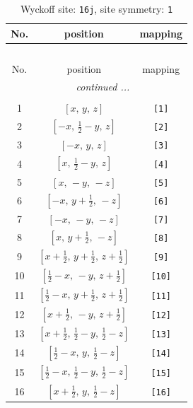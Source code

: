 \documentclass[fleqn,8pt]{jsarticle}
\begin{document}
\begin{longtable}{ccc}
\caption{Wyckoff site: {\tt 16j}, site symmetry: {\tt 1}}
 \\
 \hline \hline
No. & position & mapping \\ \hline \endfirsthead

\multicolumn{2}{l}{\tablename\ \thetable{}} \\
 \hline \hline
No. & position & mapping \\ \hline \endhead

 \hline \hline
\multicolumn{2}{r}{\footnotesize\it continued ...} \\ \endfoot

 \hline \hline
\multicolumn{2}{r}{} \\ \endlastfoot

1 & $\left[ x,\, y,\, z \right]$ & {\tt [1]} \\ \hline
2 & $\left[ - x,\, \frac{1}{2} - y,\, z \right]$ & {\tt [2]} \\ \hline
3 & $\left[ - x,\, y,\, z \right]$ & {\tt [3]} \\ \hline
4 & $\left[ x,\, \frac{1}{2} - y,\, z \right]$ & {\tt [4]} \\ \hline
5 & $\left[ x,\, - y,\, - z \right]$ & {\tt [5]} \\ \hline
6 & $\left[ - x,\, y + \frac{1}{2},\, - z \right]$ & {\tt [6]} \\ \hline
7 & $\left[ - x,\, - y,\, - z \right]$ & {\tt [7]} \\ \hline
8 & $\left[ x,\, y + \frac{1}{2},\, - z \right]$ & {\tt [8]} \\ \hline
9 & $\left[ x + \frac{1}{2},\, y + \frac{1}{2},\, z + \frac{1}{2} \right]$ & {\tt [9]} \\ \hline
10 & $\left[ \frac{1}{2} - x,\, - y,\, z + \frac{1}{2} \right]$ & {\tt [10]} \\ \hline
11 & $\left[ \frac{1}{2} - x,\, y + \frac{1}{2},\, z + \frac{1}{2} \right]$ & {\tt [11]} \\ \hline
12 & $\left[ x + \frac{1}{2},\, - y,\, z + \frac{1}{2} \right]$ & {\tt [12]} \\ \hline
13 & $\left[ x + \frac{1}{2},\, \frac{1}{2} - y,\, \frac{1}{2} - z \right]$ & {\tt [13]} \\ \hline
14 & $\left[ \frac{1}{2} - x,\, y,\, \frac{1}{2} - z \right]$ & {\tt [14]} \\ \hline
15 & $\left[ \frac{1}{2} - x,\, \frac{1}{2} - y,\, \frac{1}{2} - z \right]$ & {\tt [15]} \\ \hline
16 & $\left[ x + \frac{1}{2},\, y,\, \frac{1}{2} - z \right]$ & {\tt [16]} \\
\end{longtable}
\end{document}
